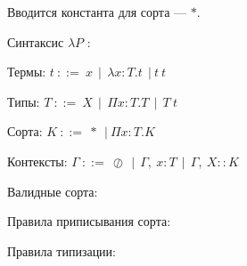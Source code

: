 Вводится константа для сорта --- $\ast$.

Синтаксис $\lambda P$ \cite{lectures, advanced}:

Термы: $t \ ::= \ x \ \  | \ \  \lambda x:T.t \ \ | \ t \ t$

Типы: $T \ ::= \ X \ \ | \ \  \Pi x:T.T \ \  | \ \  T \ t $

Сорта: $K \ ::= \ \ast \ \ | \  \Pi x:T.K$

Контексты: $\Gamma \ ::= \ \oslash \ \  | \  \ \Gamma , \ x:T \ \ | \ \ \Gamma , \ X::K$

Валидные сорта:

\begin{figure}[ht]
  \centering
\end{figure}

Правила приписывания сорта:
\begin{figure}[ht]
  \centering
\end{figure}


Правила типизации:
\begin{figure}[ht]
  \centering
\end{figure}

